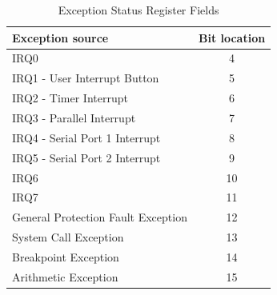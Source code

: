 \documentclass[a4paper,10pt]{article}
\begin{document}
\begin{table}[h]
\begin{center}
\begin{tabular}{|l|c|}
\hline
\textbf{Exception source} & \textbf{Bit location} \\
\hline
IRQ0 & 4 \\
\hline
IRQ1 - User Interrupt Button & 5 \\
\hline
IRQ2 - Timer Interrupt & 6 \\
\hline
IRQ3 - Parallel Interrupt & 7 \\
\hline
IRQ4 - Serial Port 1 Interrupt & 8 \\
\hline
IRQ5 - Serial Port 2 Interrupt & 9 \\
\hline
IRQ6 & 10 \\
\hline
IRQ7 & 11 \\
\hline
General Protection Fault Exception & 12 \\
\hline
System Call Exception & 13 \\
\hline
Breakpoint Exception & 14 \\
\hline
Arithmetic Exception & 15 \\
\hline
\end{tabular}
\caption{Exception Status Register Fields}
\label{table:sta_loc}
\end{center}
\end{table}
\end{document}
